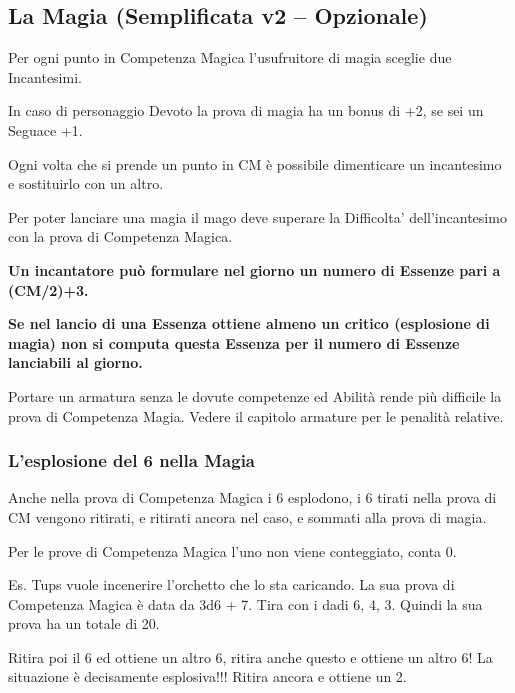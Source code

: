 \subsection{La Magia (Semplificata v2 -- Opzionale)}

\begin{multicols}{2}

Per ogni punto in Competenza Magica l'usufruitore di magia sceglie due Incantesimi.

In caso di personaggio Devoto la prova di magia ha un bonus di +2, se sei un Seguace +1.

Ogni volta che si prende un punto in CM è possibile dimenticare un incantesimo e sostituirlo con un altro.

Per poter lanciare una magia il mago deve superare la Difficolta' dell'incantesimo con la prova di Competenza Magica.

\textbf{Un incantatore può formulare nel giorno un numero di Essenze pari a (CM/2)+3.} 

\textbf{Se nel lancio di una Essenza ottiene almeno un critico (esplosione di magia) non si computa questa Essenza per il numero di Essenze lanciabili al giorno.}

Portare un armatura senza le dovute competenze ed Abilità rende più difficile la prova di Competenza Magia. Vedere il capitolo armature per le penalità relative.

\subsubsection{L'esplosione del 6 nella Magia}

\label{lesplosione-del-6-nella-magia}

Anche nella prova di Competenza Magica i 6 esplodono, i 6 tirati nella prova di CM vengono ritirati, e ritirati ancora nel caso, e sommati alla prova di magia.

Per le prove di Competenza Magica l'uno non viene conteggiato, conta 0.

Es. Tups vuole incenerire l'orchetto che lo sta caricando. La sua prova di Competenza Magica è data da 3d6 + 7. Tira con i dadi 6, 4, 3. Quindi la sua prova ha un totale di 20.

Ritira poi il 6 ed ottiene un altro 6, ritira anche questo e ottiene un altro 6! La situazione è decisamente esplosiva!!! Ritira ancora e ottiene un 2.




\end{multicols}
